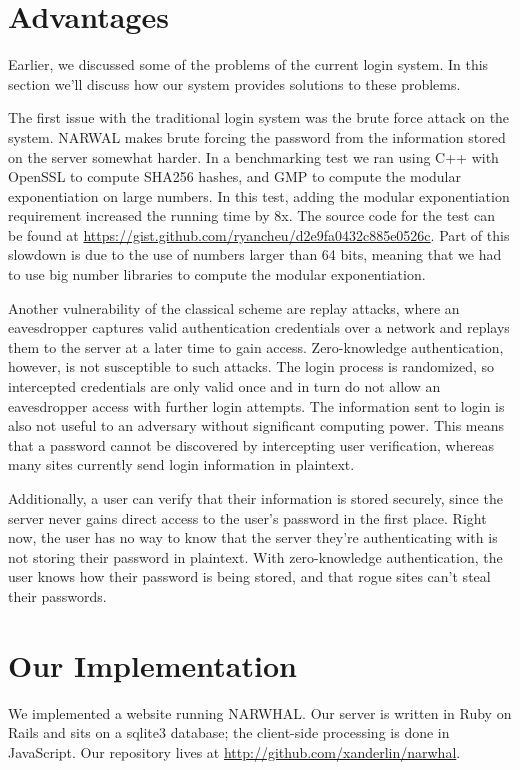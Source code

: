 \documentclass[11pt]{article}
\begin{document}
\section{Advantages}

Earlier, we discussed some of the problems of the current login system.  In this section we’ll discuss how our system provides solutions to these problems.

The first issue with the traditional login system was the brute force attack on the system.  NARWAL makes brute forcing the password from the information stored on the server somewhat harder.  In a benchmarking test we ran using C++ with OpenSSL to compute SHA256 hashes, and GMP to compute the modular exponentiation on large numbers.  In this test, adding the modular exponentiation requirement increased the running time by 8x. The source code for the test can be found at \url{https://gist.github.com/ryancheu/d2e9fa0432c885e0526c}.  Part of this slowdown is due to the use of numbers larger than 64 bits, meaning that we had to use big number libraries to compute the modular exponentiation.

Another vulnerability of the classical scheme are replay attacks, where an eavesdropper captures valid authentication credentials over a network and replays them to the server at a later time to gain access. Zero-knowledge authentication, however, is not susceptible to such attacks.  The login process is randomized, so intercepted credentials are only valid once and in turn do not allow an eavesdropper access with further login attempts.  The information sent to login is also not useful to an adversary without significant computing power.  This means that a password cannot be discovered by intercepting user verification, whereas many sites currently send login information in plaintext.

Additionally, a user can verify that their information is stored securely, since the server never gains direct access to the user’s password in the first place.  Right now, the user has no way to know that the server they’re authenticating with is not storing their password in plaintext.  With zero-knowledge authentication, the user knows how their password is being stored, and that rogue sites can’t steal their passwords.

\section{Our Implementation}

We implemented a website running NARWHAL. Our server is written in Ruby on Rails and sits on a sqlite3 database; the client-side processing is done in JavaScript. Our repository lives at \url{http://github.com/xanderlin/narwhal}.
\end{document}
